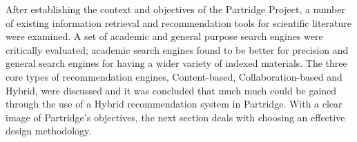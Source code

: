 After establishing the context and objectives of the Partridge Project, a
number of existing information retrieval and recommendation tools for
scientific literature were examined. A set of academic and general purpose
search engines were critically evaluated; academic search engines found to be
better for precision and general search engines for having a wider variety of
indexed materials. The three core types of recommendation engines,
Content-based, Collaboration-based and Hybrid, were discussed and it was
concluded that much much could be gained through the use of a Hybrid
recommendation system in Partridge. With a clear image of Partridge's
objectives, the next section deals with choosing an effective design
methodology.
